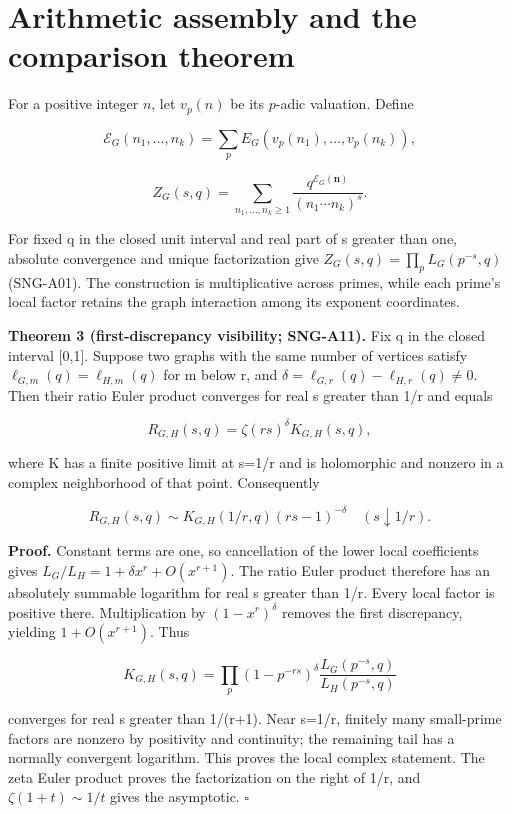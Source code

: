 \documentclass[
  11pt,
  a4paper,
]{article}
\begin{document}
\hypertarget{arithmetic-assembly-and-the-comparison-theorem}{%
\section{Arithmetic assembly and the comparison
theorem}\label{arithmetic-assembly-and-the-comparison-theorem}}

For a positive integer \(n\), let \(v_p(n)\) be its \(p\)-adic
valuation. Define

\[
 \mathcal E_G(n_1,\ldots,n_k)
 =\sum_pE_G(v_p(n_1),\ldots,v_p(n_k)),
\]

\[
 Z_G(s,q)=\sum_{n_1,\ldots,n_k\ge1}
 \frac{q^{\mathcal E_G(\mathbf n)}}{(n_1\cdots n_k)^s}.
\]

For fixed q in the closed unit interval and real part of s greater than
one, absolute convergence and unique factorization give
\(Z_G(s,q)=\prod_pL_G(p^{-s},q)\) (SNG-A01). The construction is
multiplicative across primes, while each prime's local factor retains
the graph interaction among its exponent coordinates.

\textbf{Theorem 3 (first-discrepancy visibility; SNG-A11).} Fix q in the
closed interval {[}0,1{]}. Suppose two graphs with the same number of
vertices satisfy \(\ell_{G,m}(q)=\ell_{H,m}(q)\) for m below r, and
\(\delta=\ell_{G,r}(q)-\ell_{H,r}(q)\ne0\). Then their ratio Euler
product converges for real s greater than 1/r and equals

\[
 R_{G,H}(s,q)=\zeta(rs)^\delta K_{G,H}(s,q),
\]

where K has a finite positive limit at s=1/r and is holomorphic and
nonzero in a complex neighborhood of that point. Consequently

\[
 R_{G,H}(s,q)\sim K_{G,H}(1/r,q)(rs-1)^{-\delta}
 \quad(s\downarrow1/r).
\]

\textbf{Proof.} Constant terms are one, so cancellation of the lower
local coefficients gives \(L_G/L_H=1+\delta x^r+O(x^{r+1})\). The ratio
Euler product therefore has an absolutely summable logarithm for real s
greater than 1/r. Every local factor is positive there. Multiplication
by \((1-x^r)^\delta\) removes the first discrepancy, yielding
\(1+O(x^{r+1})\). Thus

\[
 K_{G,H}(s,q)=\prod_p(1-p^{-rs})^\delta
              \frac{L_G(p^{-s},q)}{L_H(p^{-s},q)}
\]

converges for real s greater than 1/(r+1). Near s=1/r, finitely many
small-prime factors are nonzero by positivity and continuity; the
remaining tail has a normally convergent logarithm. This proves the
local complex statement. The zeta Euler product proves the factorization
on the right of 1/r, and \(\zeta(1+t)\sim1/t\) gives the asymptotic.
\(\square\)
\end{document}
